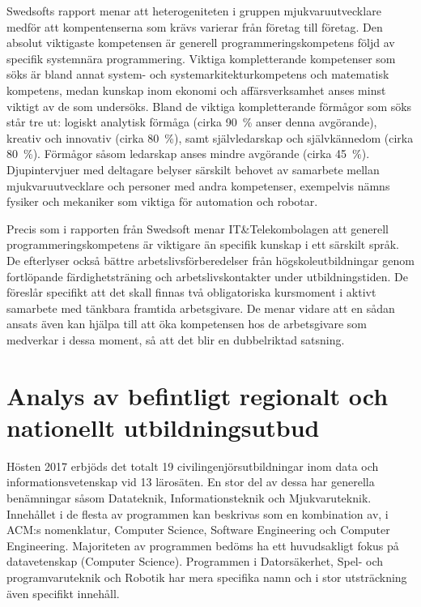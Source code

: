 Swedsofts rapport menar att heterogeniteten i gruppen mjukvaruutvecklare medför att kompentenserna som krävs varierar från företag till företag. Den absolut viktigaste kompetensen är generell programmeringskompetens följd av specifik systemnära programmering. Viktiga kompletterande kompetenser som söks är bland annat system- och systemarkitekturkompetens och matematisk kompetens, medan kunskap inom ekonomi och affärsverksamhet anses minst viktigt av de som undersöks. Bland de viktiga kompletterande förmågor som söks står tre ut: logiskt analytisk förmåga (cirka 90~\% anser denna avgörande), kreativ och innovativ (cirka 80~\%), samt självledarskap och självkännedom (cirka 80~\%). Förmågor såsom ledarskap anses mindre avgörande (cirka 45~\%). Djupintervjuer med deltagare belyser särskilt behovet av samarbete mellan mjukvaruutvecklare och personer med andra kompetenser, exempelvis nämns fysiker och mekaniker som viktiga för automation och robotar.

Precis som i rapporten från Swedsoft menar IT\&Telekombolagen att generell programmeringskompetens är viktigare än specifik kunskap i ett särskilt språk. De efterlyser också bättre arbetslivsförberedelser från högskoleutbildningar genom fortlöpande färdighetsträning och arbetslivskontakter under utbildningstiden. De föreslår specifikt att det skall finnas två obligatoriska kursmoment i aktivt samarbete med tänkbara framtida arbetsgivare. De menar vidare att en sådan ansats även kan hjälpa till att öka kompetensen hos de arbetsgivare som medverkar i dessa moment, så att det blir en dubbelriktad satsning.

\section{Analys av befintligt regionalt och nationellt utbildningsutbud}\label{sec:analysbefintnat}

Hösten 2017 erbjöds det totalt 19 civilingenjörsutbildningar inom data och informationsvetenskap vid 13 lärosäten. En stor del av dessa har generella benämningar såsom Datateknik, Informationsteknik och Mjukvaruteknik. Innehållet i de flesta av programmen kan beskrivas som en kombination av, i ACM:s nomenklatur, Computer Science, Software Engineering och Computer Engineering. Majoriteten av programmen bedöms ha ett huvudsakligt fokus på datavetenskap (Computer Science). Programmen i Datorsäkerhet, Spel- och programvaruteknik och Robotik har mera specifika namn och i stor utsträckning även specifikt innehåll.

